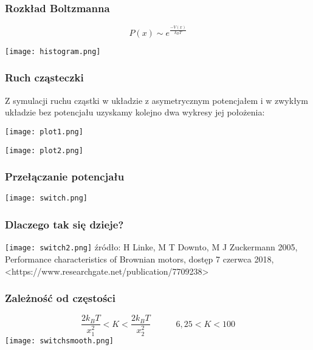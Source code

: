 \documentclass[10pt]{beamer}
\begin{document}
	\begin{frame}
		\frametitle{Rozkład Boltzmanna}
		\begin{minipage}{1\textwidth}
			\Centering
			 \begin{equation}
			\nonumber
			\boxed{ P(x) \sim e^{\frac{-V(x)}{k_B T}}}
			\end{equation}
		\end{minipage}
		\begin{minipage}{1\textwidth}
			\vspace{0.4cm}
			\Centering
			\texttt{[image: histogram.png]}
		\end{minipage}
	\end{frame}
	\begin{frame}
		\frametitle{Ruch cząsteczki}
		\justify
		Z symulacji ruchu cząstki w układzie z asymetrycznym potencjałem i w zwykłym układzie bez potencjału uzyskamy kolejno dwa wykresy jej położenia:
		\break
		\begin{minipage}{0.47\textwidth}
			\vspace{0.2cm}
			\texttt{[image: plot1.png]}
		\end{minipage}
		\begin{minipage}{0.47\textwidth}
			\vspace{0.2cm}
			\hspace{0.3cm}
			\texttt{[image: plot2.png]}
		\end{minipage}
	\end{frame}
	\begin{frame}
		\frametitle{Przełączanie potencjału}
		\Centering
		\texttt{[image: switch.png]}
	\end{frame}
	\begin{frame}
		\frametitle{Dlaczego tak się dzieje?}
			\Centering
			\texttt{[image: switch2.png]}
			\vspace{0.3cm}
			\break
			źródło: H Linke, M T Downto, M J Zuckermann 2005, Performance characteristics of Brownian motors, dostęp 7 czerwca 2018, <https://www.researchgate.net/publication/7709238>
	\end{frame}
	\begin{frame}
		\frametitle{Zależność od częstości}
		\Centering
		\begin{equation}
		\nonumber
		\frac{2 k_B T}{x_1^2}<K<\frac{2 k_B T}{x_2^2}
		\hspace{3em}
		6,25 < K < 100
		\end{equation}
		\texttt{[image: switchsmooth.png]}
	\end{frame}
\end{document}
